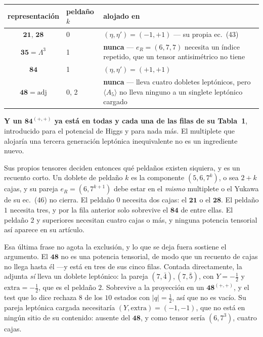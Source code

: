 \documentclass[11pt,a4paper]{article}
\newcommand{\rep}[1]{\mathbf{#1}}
\newenvironment{keyeq}
  {\begin{center}\setlength{\fboxsep}{9pt}\setlength{\fboxrule}{0.8pt}%
   \begin{lrbox}{\keyeqbox}\begin{minipage}{0.88\textwidth}}
  {\end{minipage}\end{lrbox}%
   \fcolorbox{hdrblue!55}{hdrblue!6}{\usebox{\keyeqbox}}\end{center}}
\begin{document}
\begin{center}\small
\begin{tabular}{clp{}}
\toprule
\rowcolor{hdrblue!12}
representación & peldaño $k$ & alojado en\\
\midrule
$\rep{21}$, $\rep{28}$ & 0 & $(\eta,\eta')=(-1,+1)$ --- su propia ec.~(43)\\
\rowcolor{warmred!13}
$\rep{35}=\Lambda^3$ & 1 & \textbf{nunca} --- $e_R=(6,7,7)$ necesita un índice repetido, que un
tensor antisimétrico no tiene\\
\rowcolor{amber!16}
$\rep{84}$ & 1 & $(\eta,\eta')=(+1,+1)$\\
\rowcolor{warmred!13}
$\rep{48}=\text{adj}$ & 0, 2 & \textbf{nunca} --- lleva cuatro dobletes leptónicos, pero
$\langle A_5\rangle$ no lleva ninguno a un singlete leptónico cargado\\
\bottomrule
\end{tabular}
\end{center}

\begin{keyeq}
\textbf{Y un $\rep{84}^{(+,+)}$ ya está en todas y cada una de las filas de su Tabla~1},
introducido para el potencial de Higgs y para nada más. El multiplete que alojaría una tercera
generación leptónica inequivalente no es un ingrediente nuevo.
\end{keyeq}

Sus propios tensores deciden entonces qué peldaños existen siquiera, y es un recuento corto. Un
doblete de peldaño $k$ es la componente $(5,6,7^k)$, o sea $2+k$ cajas, y su pareja
$e_R=(6,7^{k+1})$ debe estar en el \emph{mismo} multiplete o el Yukawa de su ec.~(46) no cierra. El
peldaño $0$ necesita dos cajas: el $\rep{21}$ o el $\rep{28}$. El peldaño $1$ necesita tres, y por la
fila anterior solo sobrevive el $\rep{84}$ de entre ellas. El peldaño $2$ y superiores necesitan
cuatro cajas o más, y ninguna potencia tensorial así aparece en su artículo.

Esa última frase no agota la exclusión, y lo que se deja fuera sostiene el argumento. El $\rep{48}$
no es una potencia tensorial, de modo que un recuento de cajas no llega hasta él ---y está en tres de
sus cinco filas. Contada directamente, la adjunta \emph{sí} lleva un doblete leptónico: la pareja
$(7,\bar4),(7,\bar5)$, con $Y=-\tfrac12$ y $\mathrm{extra}=-\tfrac12$, que es el peldaño $2$.
Sobrevive a la proyección en un $\rep{48}^{(+,+)}$, y el test que lo dice rechaza $8$ de los $10$
estados con $|q|=\tfrac12$, así que no es vacío. Su pareja leptónica cargada necesitaría
$(Y,\mathrm{extra})=(-1,-1)$, que no está en ningún sitio de su contenido: ausente del $\rep{48}$, y
como tensor sería $(6,7^3)$, cuatro cajas.
\end{document}
